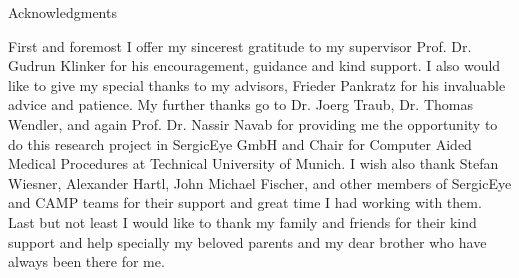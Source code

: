 \thispagestyle{empty}

\vspace*{2cm}

\begin{center}
{ Acknowledgments}
\end{center}

\vspace{1cm}

First and foremost I offer my sincerest gratitude to my supervisor Prof. Dr. Gudrun Klinker for his encouragement, guidance and kind support. I also would like to give my special thanks to my advisors, Frieder Pankratz for his invaluable advice and patience.
My further thanks go to Dr. Joerg Traub, Dr. Thomas Wendler, and again Prof. Dr. Nassir Navab for providing me the opportunity to do this research project in SergicEye GmbH and Chair for Computer Aided Medical Procedures at Technical University of Munich. I wish also thank Stefan Wiesner, Alexander Hartl, John Michael Fischer, and other members of SergicEye and CAMP teams for their support and great time I had working with them.
Last but not least I would like to thank my family and friends for their kind support and help specially my beloved parents and my dear brother who have always been there for me.

\cleardoublepage{}
